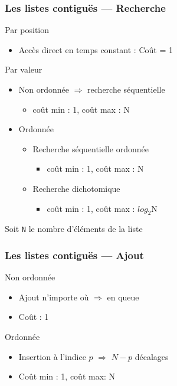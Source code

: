 \documentclass[table,handout,tikz,12pt,svgnames]{beamer}
\begin{document}
\begin{frame}[fragile=singleslide]
	\frametitle{Les listes contiguës --- Recherche}
	\begin{block}{Par position}
		\begin{itemize}
			\item Accès direct en temps constant : Coût = 1
		\end{itemize}
	\end{block}
	\begin{block}{Par valeur}
			\begin{itemize}
				\item Non ordonnée $\Rightarrow$ recherche séquentielle
				\begin{itemize}
					\item coût min : 1, coût max : N
				\end{itemize}
				\item Ordonnée
				\begin{itemize}
					\item Recherche séquentielle ordonnée
					\begin{itemize}
						\item coût min : 1, coût max : N
					\end{itemize}
					\item Recherche dichotomique
					\begin{itemize}
						\item coût min : 1, coût max : $log_2$N
					\end{itemize}
				\end{itemize}
			\end{itemize}
	\end{block}
	\begin{block}{Soit \texttt{N} le nombre d'éléments de la liste}
	\end{block}
\end{frame}


\begin{frame}[fragile=singleslide]
	\frametitle{Les listes contiguës --- Ajout}
	\begin{block}{Non ordonnée}
		\begin{itemize}
			\item Ajout n'importe où $\Rightarrow$ en queue
			\item Coût : 1
		\end{itemize}
	\end{block}
	\begin{block}{Ordonnée}
		\begin{itemize}
			\item Insertion à l'indice $p$ $\Rightarrow$ $N-p$ décalages %
			\item Coût min : 1, coût max: N
		\end{itemize}
	\end{block}
\end{frame}
\end{document}
